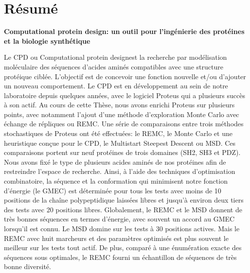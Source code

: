 

\section*{Résumé}

{\large\bf\noindent Computational protein design: un outil pour l’ingénierie des protéines et la biologie synthétique}

\bigskip

Le CPD ou \og Computational protein design\fg est la recherche par modélisation moléculaire des séquences d’acides aminés compatibles avec une structure protéique ciblée.
L’objectif est de concevoir une fonction nouvelle et/ou d’ajouter un nouveau comportement.
Le CPD est en développement au sein de notre laboratoire depuis quelques années, avec le logiciel Proteus qui a plusieurs succès à son actif.
Au cours de cette Thèse, nous avons enrichi Proteus sur plusieurs points, avec notamment l’ajout d’une méthode d’exploration Monte Carlo avec échange de répliques ou REMC. Une série de comparaisons entre trois méthodes stochastiques de Proteus ont été effectuées: le REMC, le Monte Carlo et une heuristique conçue pour le CPD, le \og Multistart Steepest Descent \fg ou MSD. Ces comparaisons portent sur neuf protéines de trois domaines (SH2, SH3 et PDZ). Nous avons fixé le type de plusieurs acides aminés de nos protéines afin de restreindre l’espace de recherche. Ainsi, à l'aide des techniques d’optimisation combinatoire, la séquence et la conformation qui minimisent notre fonction d’énergie (le GMEC) est déterminée pour tous les tests avec moins de 10 positions de la chaîne polypeptidique laissées libres et jusqu’à environ deux tiers des tests avec 20 positions libres. Globalement, le REMC et le MSD donnent de très bonnes séquences en termes d’énergie, avec souvent un accord au GMEC lorsqu’il est connu. Le MSD domine sur les tests à 30 positions actives. Mais le REMC avec huit marcheurs et des paramètres optimisés est plus souvent le meilleur sur les tests tout actif. De plus, comparé à une énumération exacte des séquences sous optimales, le REMC fourni un échantillon de séquences de très bonne diversité.

